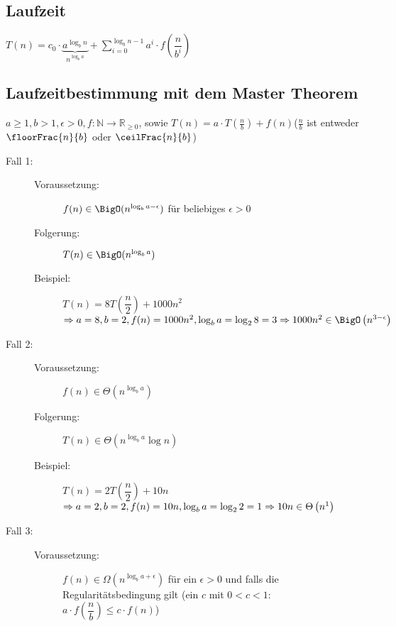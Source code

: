 	\subsection{Laufzeit}
		$T(n)=c_0\cdot \underbrace{a^{\log_b n}}_{n^{\log_b a}} + \sum\limits_{i=0}^{\log_b n -1} a^i \cdot f\left(\dfrac{n}{b^i}\right)$
	\topbreak
	\vspace*{-2\baselineskip}\subsection{Laufzeitbestimmung mit dem Master Theorem}
		$a \geq 1, b> 1, \epsilon>0, f : \mathbb{N} \rightarrow \mathbb{R}_{\geq 0}$, sowie $T(n)= a \cdot T(\frac{n}{b}) + f(n)$\hfill ($\frac{n}{b}$ ist entweder $\floorFrac{n}{b}$ oder $\ceilFrac{n}{b}$)
		\begin{description}
			\item[Fall 1:]
				\begin{description}
					\item[Voraussetzung: ]$f(n)\in \BigO(n^{\log_b a - \epsilon})$ für beliebiges $\epsilon>0$
					\item[Folgerung: ]$T(n) \in \BigO(n^{\log_b a})$
					\item[Beispiel: ]$T(n) = 8 T\left( \dfrac{n}{2}\right) + 1000n^2$\\
					$\Rightarrow a = 8, b = 2, f(n) = 1000n^2,   \log_b a = \log_2 8 = 3\\
					\Rightarrow 1000n^2 \in \BigO\left(n^{3 - \epsilon} \right)$
				\end{description}
			\item[Fall 2:] 
				\begin{description}
					\item[Voraussetzung: ]$f(n) \in \Theta\left( n^{\log_b a} \right)$
					\item[Folgerung: ]$T(n) \in \Theta\left( n^{\log_b a} \log n\right)$
					\item[Beispiel: ]$T(n) = 2 T\left(\dfrac{n}{2}\right) + 10n$\\
					$\Rightarrow a = 2, b = 2, f(n) = 10n, \log_b a = \log_2 2 = 1\\
					\Rightarrow 10n \in \Theta\left( n^{1} \right)$
				\end{description}
			\item[Fall 3:] 
				\begin{description}
					\item[Voraussetzung: ]$f(n) \in \Omega\left( n^{\log_b a + \epsilon} \right)$ für ein $\epsilon>0$ und falls die Regularitätsbedingung gilt (ein $c$ mit $0 < c < 1$: $	a\cdot f\left(\dfrac{n}{b}\right) \leq c\cdot f(n)$)

\end{description}
\end{description}
